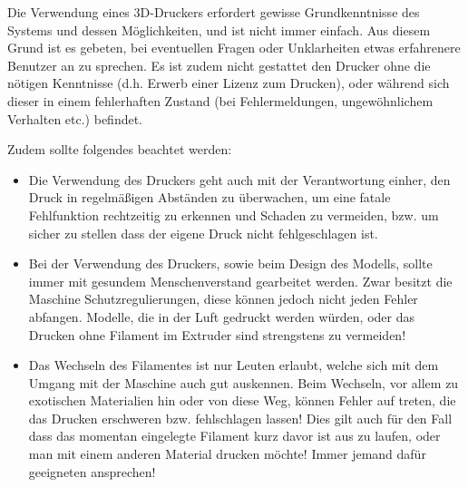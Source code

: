 Die Verwendung eines 3D-Druckers erfordert gewisse Grundkenntnisse des Systems und dessen Möglichkeiten, und ist nicht immer einfach. Aus diesem Grund ist es gebeten, bei eventuellen Fragen oder Unklarheiten etwas erfahrenere Benutzer an zu sprechen. Es ist zudem nicht gestattet den Drucker ohne die nötigen Kenntnisse (d.h. Erwerb einer Lizenz zum Drucken), oder während sich dieser in einem fehlerhaften Zustand (bei Fehlermeldungen, ungewöhnlichem Verhalten etc.) befindet.

Zudem sollte folgendes beachtet werden: 
\begin{itemize}
\item Die Verwendung des Druckers geht auch mit der Verantwortung einher, den Druck in regelmäßigen Abständen zu überwachen, um eine fatale Fehlfunktion rechtzeitig zu erkennen und Schaden zu vermeiden, bzw. um sicher zu stellen dass der eigene Druck nicht fehlgeschlagen ist.

\item Bei der Verwendung des Druckers, sowie beim Design des Modells, sollte immer mit gesundem Menschenverstand gearbeitet werden. Zwar besitzt die Maschine Schutzregulierungen, diese können jedoch nicht jeden Fehler abfangen. Modelle, die in der Luft gedruckt werden würden, oder das Drucken ohne Filament im Extruder sind strengstens zu vermeiden! 

\item Das Wechseln des Filamentes ist nur Leuten erlaubt, welche sich mit dem Umgang mit der Maschine auch gut auskennen. Beim Wechseln, vor allem zu exotischen Materialien hin oder von diese Weg, können Fehler auf treten, die das Drucken erschweren bzw. fehlschlagen lassen! 
Dies gilt auch für den Fall dass das momentan eingelegte Filament kurz davor ist aus zu laufen, oder man mit einem anderen Material drucken möchte! Immer jemand dafür geeigneten ansprechen!
\end{itemize}

